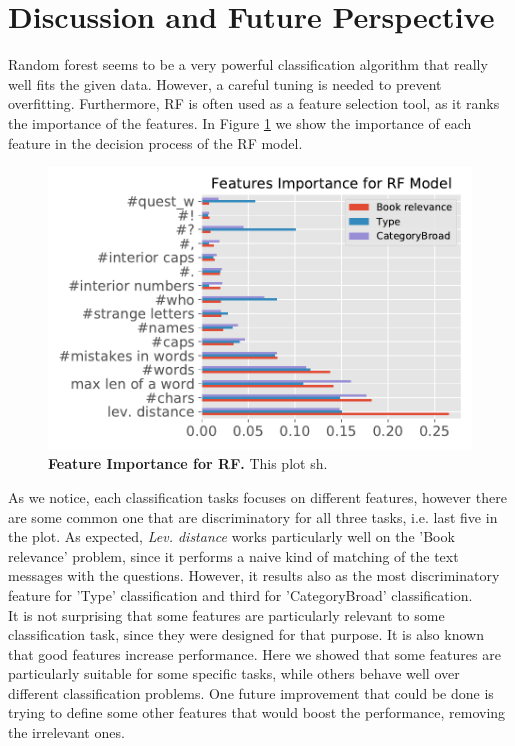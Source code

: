 \documentclass[11pt,a4paper]{article}
\begin{document}
\section{Discussion and Future Perspective}
Random forest seems to be a very powerful classification algorithm that really well fits the given data. However, a careful tuning is needed to prevent overfitting. Furthermore, RF is often used as a feature selection tool, as it ranks the importance of the features. In Figure \ref{fig:ft_imp_RF} we show the importance of each feature in the decision process of the RF model.
\begin{figure}[h]
    \centering
    \includegraphics[width = \linewidth]{../results/feature_imp_RF_plot.pdf}
    \caption{\textbf{Feature Importance for RF.} This plot sh.}
    \label{fig:ft_imp_RF}
\end{figure}
As we notice, each classification tasks focuses on different features, however there are some common one that are discriminatory for all three tasks, i.e. last five in the plot. As expected, \textit{Lev. distance} works particularly well on the 'Book relevance' problem, since it performs a naive kind of matching of the text messages with the questions. However, it results also as the most discriminatory feature for 'Type' classification and third for 'CategoryBroad' classification.\\
It is not surprising that some features are particularly relevant to some classification task, since they were designed for that purpose. It is also known that good features increase performance. Here we showed that some features are particularly suitable for some specific tasks, while others behave well over different classification problems. One future improvement that could be done is trying to define some other features that would boost the performance, removing the irrelevant ones. \\
\end{document}
